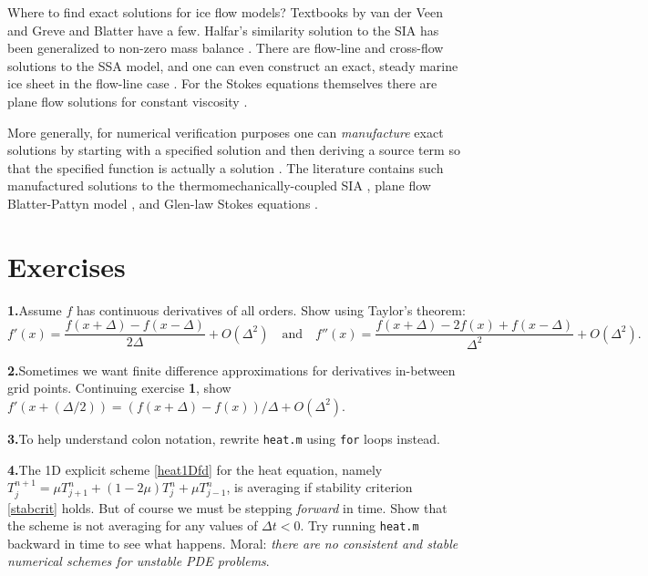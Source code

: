 \documentclass[letterpaper,final,12pt,reqno]{amsart}
\begin{document}
Where to find exact solutions for ice flow models?  Textbooks by van der Veen \cite{vanderVeen} and Greve and Blatter \cite{GreveBlatter2009} have a few.  Halfar's similarity solution to the SIA \cite{Halfar81,Halfar83} has been generalized to non-zero mass balance \cite{BLKCB}.  There are flow-line \cite{Bodvardsson,vanderVeen83} and cross-flow \cite{SchoofStream} solutions to the SSA model, and one can even construct an exact, steady marine ice sheet in the flow-line case \cite{Bueler2014exactmarine}.  For the Stokes equations themselves there are plane flow solutions for constant viscosity \cite{BaliseRaymond1985}.

More generally, for numerical verification purposes one can \emph{manufacture} exact solutions by starting with a specified solution and then deriving a source term so that the specified function is actually a solution \cite{Bueler2021,Roache}.  The literature contains such manufactured solutions to the thermomechanically-coupled SIA \cite{BBL}, plane flow Blatter-Pattyn model \cite{GlowinskiRappaz}, and Glen-law Stokes equations \cite{JouvetRappaz2011,Lengetal2012,SargentFastook2010}.

\footnotesize

\bigskip
\bigskip
%


\bigskip
\bigskip
\small
\section*{Exercises}

\newcommand{\exer}[2]{\medskip\noindent \textbf{#1.}\quad #2}

\exer{1}{Assume $f$ has continuous derivatives of all orders.  Show using Taylor's theorem:
  $$f'(x) = \frac{f(x+\Delta) - f(x-\Delta)}{2\Delta} + O(\Delta^2) \quad \text{and} \quad f''(x) = \frac{f(x+\Delta) - 2 f(x) + f(x-\Delta)}{\Delta^2} + O(\Delta^2).$$}

\exer{2}{Sometimes we want finite difference approximations for derivatives in-between grid points.  Continuing exercise \textbf{1}, show $f'(x+(\Delta/2)) = (f(x+\Delta) - f(x))/\Delta + O(\Delta^2)$.}

\exer{3}{To help understand colon notation, rewrite \texttt{heat.m} using \texttt{for} loops instead.}

\exer{4}{The 1D explicit scheme \eqref{heat1Dfd} for the heat equation, namely $T_j^{n+1} = \mu T_{j+1}^n + (1 - 2 \mu) T_j^n + \mu T_{j-1}^n$, is averaging if stability criterion \eqref{stabcrit} holds.  But of course we must be stepping \emph{forward} in time.  Show that the scheme is not averaging for any values of $\Delta t < 0$.  Try running \texttt{heat.m} backward in time to see what happens.  Moral: \emph{there are no consistent and stable numerical schemes for unstable PDE problems}.}
\end{document}
